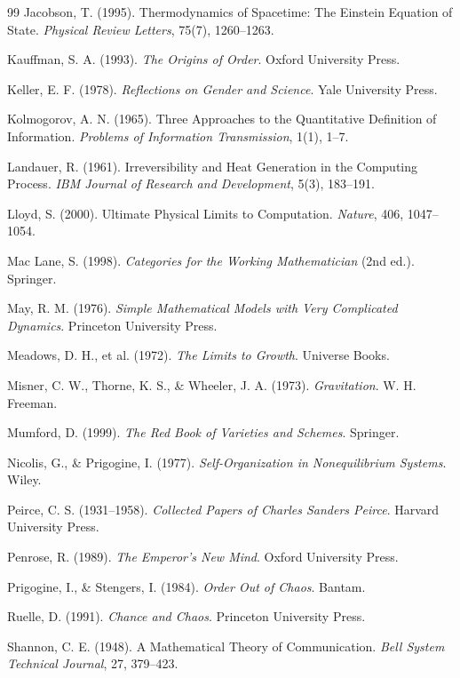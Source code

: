 \documentclass[12pt]{article}
\begin{document}
\begin{thebibliography}{99}
Jacobson, T. (1995).
Thermodynamics of Spacetime: The Einstein Equation of State.
\textit{Physical Review Letters}, 75(7), 1260--1263.

Kauffman, S. A. (1993).
\textit{The Origins of Order}.
Oxford University Press.

Keller, E. F. (1978).
\textit{Reflections on Gender and Science}.
Yale University Press.

Kolmogorov, A. N. (1965).
Three Approaches to the Quantitative Definition of Information.
\textit{Problems of Information Transmission}, 1(1), 1--7.

Landauer, R. (1961).
Irreversibility and Heat Generation in the Computing Process.
\textit{IBM Journal of Research and Development}, 5(3), 183--191.

Lloyd, S. (2000).
Ultimate Physical Limits to Computation.
\textit{Nature}, 406, 1047--1054.

Mac Lane, S. (1998).
\textit{Categories for the Working Mathematician} (2nd ed.).
Springer.

May, R. M. (1976).
\textit{Simple Mathematical Models with Very Complicated Dynamics}.
Princeton University Press.

Meadows, D. H., et al. (1972).
\textit{The Limits to Growth}.
Universe Books.

Misner, C. W., Thorne, K. S., \& Wheeler, J. A. (1973).
\textit{Gravitation}.
W. H. Freeman.

Mumford, D. (1999).
\textit{The Red Book of Varieties and Schemes}.
Springer.

Nicolis, G., \& Prigogine, I. (1977).
\textit{Self-Organization in Nonequilibrium Systems}.
Wiley.

Peirce, C. S. (1931--1958).
\textit{Collected Papers of Charles Sanders Peirce}.
Harvard University Press.

Penrose, R. (1989).
\textit{The Emperor's New Mind}.
Oxford University Press.

Prigogine, I., \& Stengers, I. (1984).
\textit{Order Out of Chaos}.
Bantam.

Ruelle, D. (1991).
\textit{Chance and Chaos}.
Princeton University Press.

Shannon, C. E. (1948).
A Mathematical Theory of Communication.
\textit{Bell System Technical Journal}, 27, 379--423.


\end{thebibliography}
\end{document}

